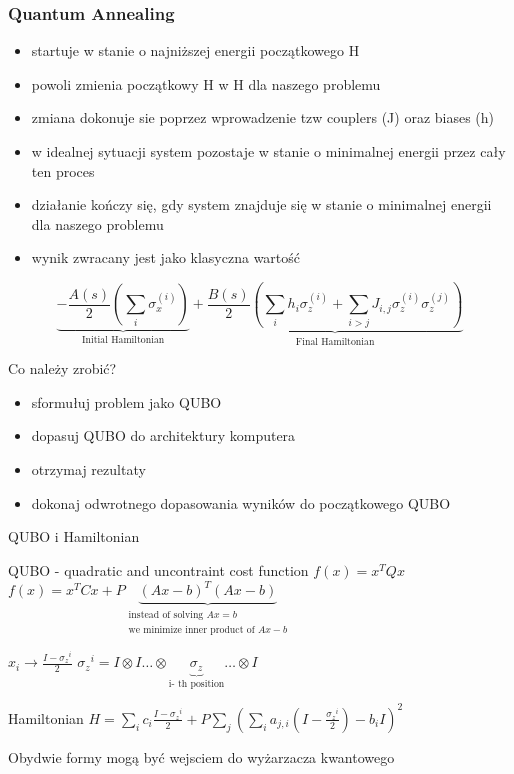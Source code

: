 \begin{frame}
\frametitle{Quantum Annealing}
\small
\begin{itemize}
\item 
startuje w stanie o najniższej energii początkowego H
\item powoli zmienia początkowy H w H dla naszego problemu
\item zmiana dokonuje sie poprzez wprowadzenie  tzw  couplers (J) oraz biases (h) 
\item w idealnej sytuacji system pozostaje w stanie o minimalnej energii przez cały ten proces 
 
 \item działanie kończy się, gdy system znajduje się w stanie o minimalnej energii dla naszego problemu
\item wynik zwracany jest jako klasyczna wartość
\end{itemize}


$$\underbrace{- \frac{A({s})}{2} \left(\sum_i {\sigma_{x}^{(i)}}\right)}_\text{Initial Hamiltonian} + \underbrace{\frac{B({s})}{2} \left(\sum_{i} h_i {\sigma_{z}^{(i)}} + \sum_{i>j} J_{i,j} {\sigma_{z}^{(i)}} {\sigma_{z}^{(j)}}\right)}_\text{Final Hamiltonian}$$

\end{frame}
\begin{frame}{Co należy zrobić?}
 \begin{itemize}
     \item sformułuj problem jako QUBO
\item dopasuj QUBO do architektury komputera
\item otrzymaj rezultaty 
\item dokonaj odwrotnego dopasowania wyników do początkowego QUBO
 \end{itemize}   
\end{frame}

\begin{frame}{QUBO i Hamiltonian}
\begin{block}{QUBO - quadratic and uncontraint cost function $f(x)=x^TQx$}
$f(x)=x^TCx+P\underbrace{(Ax-b)^T(Ax-b)}_{\substack{\text{instead of solving } Ax=b \\ \text{we minimize inner product of }
Ax-b
}}$ 
\end{block}
   $x_i \rightarrow \frac{I-{\sigma_z}^i}{2}$ \arrowupdown  ${\sigma_z}^i= I\otimes I\dots\otimes\underbrace{\sigma_z}_{\text{i- th position}}\dots\otimes I$\\
  
\begin{block}{Hamiltonian}
$H=\sum_{i}c_i\frac{I-{\sigma_z}^i}{2}+P\sum_j (\sum_ia_{j,i}(I-\frac{{\sigma_z}^i}{2})-b_iI)^2$
\end{block} 
Obydwie formy mogą być wejsciem do wyżarzacza kwantowego
\end{frame}

